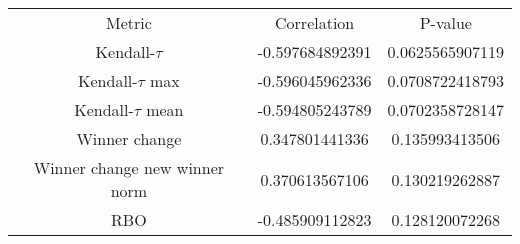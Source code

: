 \begin{tabular}{c|c|c}
Metric & Correlation & P-value \\ 
Kendall-$\tau$ & -0.597684892391 & 0.0625565907119 \\ 
Kendall-$\tau$ max & -0.596045962336 & 0.0708722418793 \\ 
Kendall-$\tau$ mean & -0.594805243789 & 0.0702358728147 \\ 
Winner change & 0.347801441336 & 0.135993413506 \\ 
Winner change new winner norm & 0.370613567106 & 0.130219262887 \\ 
RBO & -0.485909112823 & 0.128120072268 \\ 
\end{tabular}